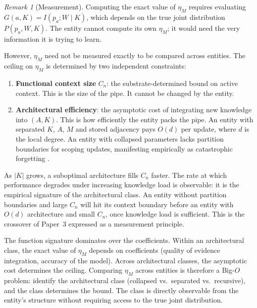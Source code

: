 \documentclass[11pt]{article}
\theoremstyle{definition}
\theoremstyle{remark}
\newtheorem{remark}{Remark}
\begin{document}
\begin{remark}[Measurement]
\label{rem:measurement}
Computing the exact value of $\eta_M$ requires evaluating
$G(a, K) = I(p_a; W \mid K)$, which depends on the true joint
distribution $P(p_a, W, K)$. The entity cannot compute its own
$\eta_M$; it would need the very information it is trying to learn.

However, $\eta_M$ need not be measured exactly to be compared across
entities. The ceiling on $\eta_M$ is determined by two independent
constraints:

\begin{enumerate}
\item \textbf{Functional context size} $C_n$: the substrate-determined
   bound on active context. This is the size of the pipe. It cannot be
   changed by the entity.

\item \textbf{Architectural efficiency}: the asymptotic cost of
   integrating new knowledge into $(A, K)$. This is how efficiently
   the entity packs the pipe. An entity with separated $K$, $A$, $M$
   and stored adjacency pays $O(d)$ per update, where $d$ is the
   local degree. An entity with collapsed parameters lacks partition
   boundaries for scoping updates, manifesting empirically as
   catastrophic forgetting \cite{McCloskey1989,Kirkpatrick2017}.
\end{enumerate}

As $|K|$ grows, a suboptimal architecture fills $C_n$ faster. The
rate at which performance degrades under increasing knowledge load is
observable: it is the empirical signature of the architectural class.
An entity without partition boundaries and large $C_n$ will hit its
context boundary before an entity with $O(d)$ architecture and small
$C_n$, once knowledge load is sufficient. This is the crossover of
Paper~3 \cite{McCarthy2026c} expressed as a measurement principle.

The function signature dominates over the coefficients. Within an
architectural class, the exact value of $\eta_M$ depends on
coefficients (quality of evidence integration, accuracy of the model).
Across architectural classes, the asymptotic cost determines the
ceiling. Comparing $\eta_M$ across entities is therefore a Big-$O$
problem: identify the architectural class (collapsed vs.\ separated
vs.\ recursive), and the class determines the bound. The class is
directly observable from the entity's structure without requiring
access to the true joint distribution.
\end{remark}
\end{document}
